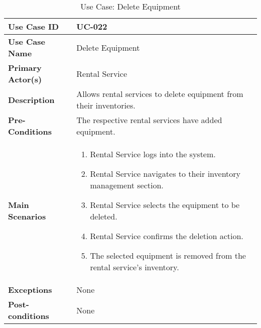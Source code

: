 \begin{table}[ht]
    \centering
    \begin{tabular}{|l|p{}|}
        \hline
        \textbf{Use Case ID} & UC-022 \\
        \hline
        \textbf{Use Case Name} & Delete Equipment \\
        \hline
        \textbf{Primary Actor(s)} & Rental Service \\
        \hline
        \textbf{Description} & Allows rental services to delete equipment from their inventories. \\
        \hline
        \textbf{Pre-Conditions} & The respective rental services have added equipment. \\
        \hline
        \textbf{Main Scenarios} & 
        \begin{enumerate}[label=\arabic*.,itemsep=0pt]
            \item Rental Service logs into the system.
            \item Rental Service navigates to their inventory management section.
            \item Rental Service selects the equipment to be deleted.
            \item Rental Service confirms the deletion action.
            \item The selected equipment is removed from the rental service's inventory.
        \end{enumerate} \\
        \hline
        \textbf{Exceptions} & None \\
        \hline
        \textbf{Post-conditions} & None \\
        \hline
    \end{tabular}
    \label{tab:use-case-delete-equipment}
    \caption{Use Case: Delete Equipment}
\end{table}


